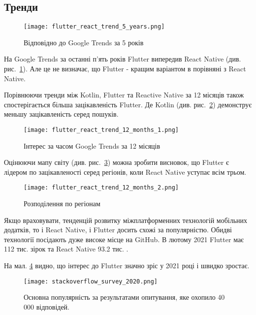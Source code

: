 \subsection{Тренди}
\label{subsec:mobile_trends}

\begin{figure}
    \texttt{[image: flutter\_react\_trend\_5\_years.png]}
    \caption{Відповідно до Google Trends за 5 років}
    \label{fig:flutter_react_trend_5_years}
\end{figure}

На Google Trends за останні п’ять років Flutter випередив React Native (див. рис.~\ref{fig:flutter_react_trend_5_years}).
Але це не визначає, що Flutter - кращим варіантом в порівняні з React Native.

Порівнюючи тренди між Kotlin, Flutter та Reactive Native за 12 місяців також спостерігається більша зацікавленість Flutter.
Де Kotlin (див. рис.~\ref{fig:flutter_react_trend_12_months_1}) демонструє меньшу зацікавленість серед пошуків.
\begin{figure}
    \texttt{[image: flutter\_react\_trend\_12\_months\_1.png]}
    \caption{Інтерес за часом Google Trends за 12 місяців \cite{google_trends}}
    \label{fig:flutter_react_trend_12_months_1}
\end{figure}

Оцінюючи мапу світу (див. рис.~\ref{fig:flutter_react_trend_12_months_2}) можна зробити висновок,
що Flutter є лідером по зацікавленості серед регіонів, коли React Native уступає всім трьом.

\begin{figure}
    \texttt{[image: flutter\_react\_trend\_12\_months\_2.png]}
    \caption{Розподілення по регіонам \cite{google_trends}}
    \label{fig:flutter_react_trend_12_months_2}
\end{figure}

Якщо враховувати, тенденцій розвитку міжплатформенних технологій мобільних додатків, то і React Native, і Flutter досить схожі за популярністю.
Обидві технології посідають дуже високе місце на GitHub.
В лютому 2021 Flutter має 112 тис. зірок \cite{flutter_gihtub} та React Native 93.2 тис. \cite{rn_gihtub}.

На мал. \ref{fig:stackoverflow_survey_2020} видно, що інтерес до Flutter значно зріс у 2021 році і швидко зростає.

\begin{figure}
    \begin{center}
        \texttt{[image: stackoverflow\_survey\_2020.png]}
    \end{center}
    \caption{Основна популярність за результатами опитування, яке охопило 40 000 відповідей. \cite{stackoverflow_survey_2020}}
    \label{fig:stackoverflow_survey_2020}
\end{figure}

